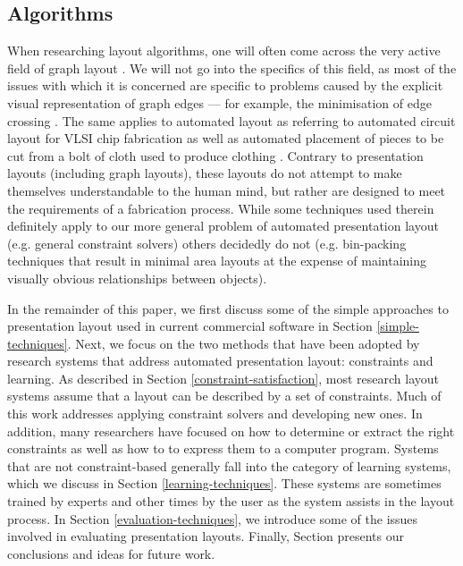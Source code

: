    \subsection{Algorithms}
    \label{related-algorithms}

    When researching layout algorithms, one will often come across the very
    active field of graph layout \citep{battista-1}. We will not go into the
    specifics of this field, as most of the issues with which it is concerned
    are specific to problems caused by the explicit visual representation of
    graph edges --- for example, the minimisation of edge crossing
    \citep{battista-2, shahrokhi-1}. The same applies to automated layout as
    referring to automated circuit layout for VLSI chip fabrication
    \citep{hu-1, lengauer-1} as well as automated placement of pieces to be cut
    from a bolt of cloth used to produce clothing \citep{milenkovic-1}.
    Contrary to presentation layouts (including graph layouts), these layouts
    do not attempt to make themselves understandable to the human mind, but
    rather are designed to meet the requirements of a fabrication process.
    While some techniques used therein definitely apply to our more general
    problem of automated presentation layout (e.g. general constraint solvers)
    others decidedly do not (e.g.  bin-packing techniques \citep{hofri-1} that
    result in minimal area layouts at the expense of maintaining visually
    obvious relationships between objects).


    In the remainder of this paper, we first discuss some of the simple
    approaches to presentation layout used in current commercial software in
    Section \ref{simple-techniques}. Next, we focus on the two methods that
    have been adopted by research systems that address automated presentation
    layout: constraints and learning. As described in Section
    \ref{constraint-satisfaction}, most research layout systems assume that a
    layout can be described by a set of constraints. Much of this work
    addresses applying constraint solvers and developing new ones. In addition,
    many researchers have focused on how to determine or extract the right
    constraints as well as how to to express them to a computer program.
    Systems that are not constraint-based generally fall into the category of
    learning systems, which we discuss in Section \ref{learning-techniques}.
    These systems are sometimes trained by experts and other times by the user
    as the system assists in the layout process. In Section
    \ref{evaluation-techniques}, we introduce some of the issues involved in
    evaluating presentation layouts. Finally, Section
    \label{conclusions-layout-paper} presents our conclusions and ideas for
    future work.

